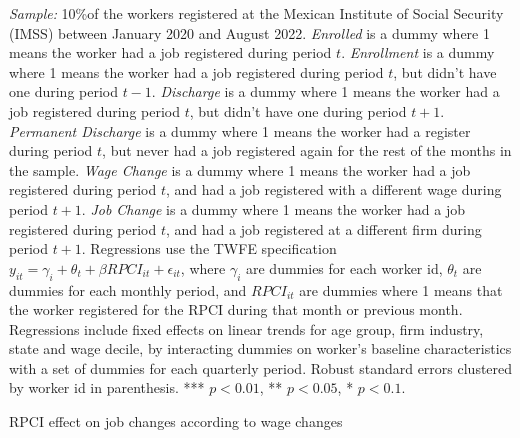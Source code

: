 \documentclass[oneside,11pt]{article}
\begin{document}
\scriptsize{
\noindent \textit{Sample:} 10\%of the workers registered at the Mexican Institute of Social Security (IMSS) between January 2020 and August 2022. \textit{Enrolled} is a dummy where 1 means the worker had a job registered during period $t$. \textit{Enrollment} is a dummy where 1 means the worker had a job registered during period $t$, but didn't have one during period $t-1$. \textit{Discharge} is a dummy where 1 means the worker had a job registered during period $t$, but didn't have one during period $t+1$. \textit{Permanent Discharge} is a dummy where 1 means the worker had a register during period $t$, but never had a job registered again for the rest of the months in the sample. \textit{Wage Change} is a dummy where 1 means the worker had a job registered during period $t$, and had a job registered with a different wage during period $t+1$. \textit{Job Change} is a dummy where 1 means the worker had a job registered during period $t$, and had a job registered at a different firm during period $t+1$. Regressions use the TWFE specification $y_{it} = \gamma_{i} + \theta_{t}+ \beta RPCI_{it} +\epsilon_{it}$, where $\gamma_{i}$ are dummies for each worker id, $\theta_{t}$ are dummies for each monthly period, and $RPCI_{it}$ are dummies where 1 means that the worker registered for the RPCI during that month or previous month. Regressions include fixed effects on linear trends for age group, firm industry, state and wage decile, by interacting dummies on worker's baseline characteristics with a set of dummies for each quarterly period. Robust standard errors clustered by worker id in parenthesis. *** $p<0.01$, ** $p<0.05$, * $p<0.1$.
}

\clearpage

\begin{table}[H]
    \caption{RPCI effect on job changes according to wage changes}
    \label{twfe_job_change_wage}
    \begin{center}
    \scriptsize{}
    \end{center}
\end{table}
\end{document}
